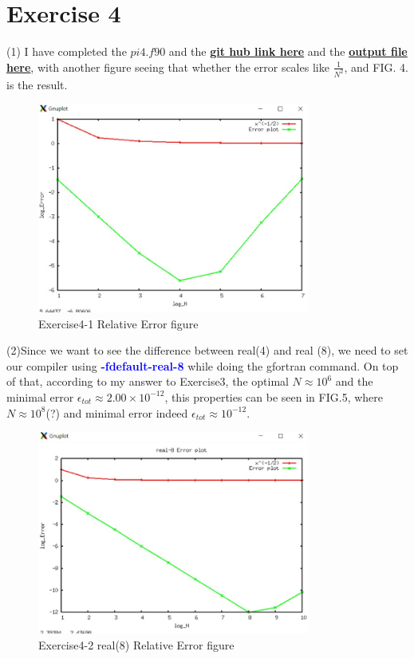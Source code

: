 \documentclass[aps,12pt,prd,nofootinbib,bibnotes, amsmath,amssymb,showpacs,superscriptaddress,floatfix]{revtex4-2}
\begin{document}
\section{Exercise 4}

(1) I have completed the $pi4.f90$ and the \href{https://github.com/kuo1235/Computational-Astrophysics-2022/blob/main/astr660/Homework/HW2/Exercise2-(3).py}{\bf{git hub link here}} and the \href{https://github.com/kuo1235/Computational-Astrophysics-2022/blob/main/astr660/Homework/HW2/error.dat}{\bf{output file here}}, with another figure seeing that whether the error scales like $\frac{1}{N^2}$, and FIG. 4. is the result.\\

\begin{figure}
	\centering
	\includegraphics[width=0.8\textwidth]{Exercise4-1}
	\caption{Exercise4-1 Relative Error figure}
\end{figure}

(2)Since we want to see the difference between real(4) and real (8), we need to set our compiler using \textcolor{blue}{\bf{-fdefault-real-8}} while doing the gfortran command. On top of that, according to my answer to Exercise3, the optimal $N \approx 10^6$ and the minimal error $\epsilon_{tot} \approx 2.00 \times 10^{-12}$, this properties can be seen in FIG.5, where $N \approx 10^8$(?) and minimal error indeed $\epsilon_{tot} \approx 10^{-12}$.\\
\begin{figure}
	\centering
	\includegraphics[width=0.8\textwidth]{Exercise4-2}
	\caption{Exercise4-2 real(8) Relative Error figure}
\end{figure}
\end{document}
